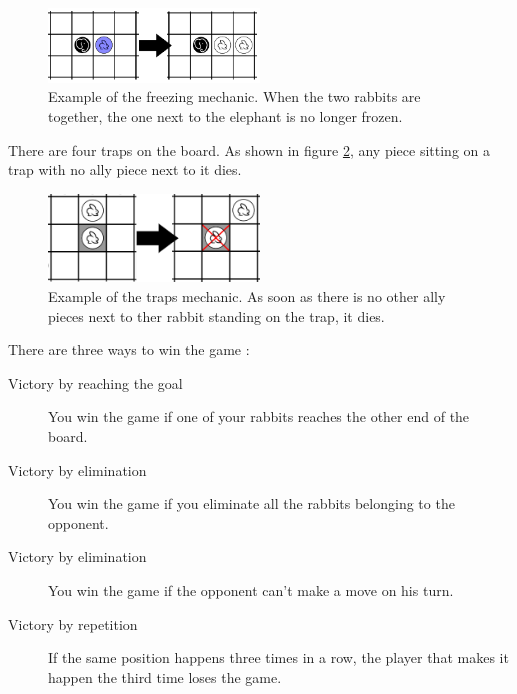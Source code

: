 \begin{figure}[!h]
\centering
\includegraphics[width=0.5\textwidth]{1_Presentation/1.1_Arimaa_rules_Gabriel/Pictures/Freeze.png}
\caption[Example of the freezing mechanic.]{Example of the freezing mechanic. When the two rabbits are together, the one next to the elephant is no longer frozen.}
\label{fig:freeze}
\end{figure}

There are four traps on the board. As shown in figure \ref{fig:trap}, any piece sitting on a trap with no ally piece next to it dies.

\begin{figure}[!h]
\centering
\includegraphics[width=0.5\textwidth]{1_Presentation/1.1_Arimaa_rules_Gabriel/Pictures/Trap.png}
\caption[Example of the traps mechanic.]{Example of the traps mechanic. As soon as there is no other ally pieces next to ther rabbit standing on the trap, it dies.}
\label{fig:trap}
\end{figure}

There are three ways to win the game :

\begin{description}
\item[Victory by reaching the goal] You win the game if one of your rabbits reaches the other end of the board.
\item[Victory by elimination] You win the game if you eliminate all the rabbits belonging to the opponent.
\item[Victory by elimination] You win the game if the opponent can't make a move on his turn.
\item[Victory by repetition] If the same position happens three times in a row, the player that makes it happen the third time loses the game.
\end{description}